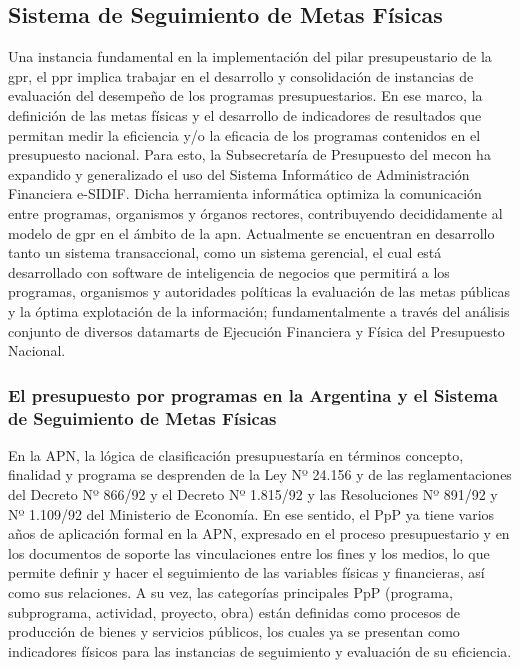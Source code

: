\subsection{Sistema de Seguimiento de Metas Físicas}


Una instancia fundamental en la implementación del pilar presupeustario de la \ac{gpr}, el \ac{ppr} implica trabajar en el desarrollo y consolidación de instancias de evaluación del desempeño de los programas presupuestarios. En ese marco, la definición de las metas físicas y el desarrollo de indicadores de resultados que permitan medir la eficiencia y/o la eficacia de los programas contenidos en el presupuesto nacional.
Para esto, la Subsecretaría de Presupuesto del \ac{mecon} ha expandido y generalizado el uso del Sistema Informático de Administración Financiera e-SIDIF. Dicha herramienta informática optimiza la comunicación entre programas, organismos y órganos rectores, contribuyendo decididamente al modelo de \ac{gpr} en el ámbito de la \ac{apn}. Actualmente se encuentran en desarrollo tanto un sistema transaccional, como un sistema gerencial, el cual está desarrollado con software de inteligencia de negocios que permitirá a los programas, organismos y autoridades políticas la evaluación de las metas públicas y la óptima explotación de la información; fundamentalmente a través del análisis conjunto de diversos datamarts  de Ejecución Financiera y Física del Presupuesto Nacional. 

\subsubsection*{El presupuesto por programas en la Argentina y el Sistema de Seguimiento de Metas Físicas}  


En la APN, la lógica de clasificación presupuestaría en términos concepto, finalidad y programa se desprenden de la Ley Nº 24.156 y de las reglamentaciones del Decreto Nº 866/92 y el Decreto Nº 1.815/92 y las Resoluciones Nº 891/92 y Nº 1.109/92 del Ministerio de Economía. En ese sentido, el PpP ya tiene varios años de aplicación formal en la APN, expresado en el proceso presupuestario y en los documentos de soporte las vinculaciones entre los fines y los medios, lo que permite definir y hacer el seguimiento de las variables físicas y financieras, así como sus relaciones. A su vez, las categorías principales PpP (programa, subprograma, actividad, proyecto, obra) están definidas como procesos de producción de bienes y servicios públicos, los cuales ya se presentan como indicadores físicos para las instancias de seguimiento y evaluación de su eficiencia. 

